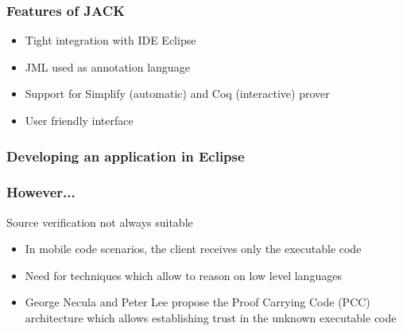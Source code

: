 \documentclass{beamer}
\begin{document}



\begin{frame}\frametitle{Features of JACK}
\begin{itemize}
\item Tight integration with IDE Eclipse
\item JML used as annotation language
\item Support for Simplify (automatic) and Coq (interactive) prover
\item User friendly interface
\end{itemize}
\end{frame}


\begin{frame}[shrink]\frametitle{Developing an application in Eclipse}
\vspace*{-1.5em}
\end{frame}

\begin{frame}\frametitle{However...}
  Source verification not always suitable
   \begin{itemize}
     \item In mobile code  scenarios, the client receives only the
           executable code    
     \item Need for techniques which allow to reason on low level languages   
     \item George Necula and Peter Lee propose the Proof Carrying Code (PCC) architecture
       which allows establishing trust in the unknown executable code
   \end{itemize}  
\end{frame}
\end{document}
